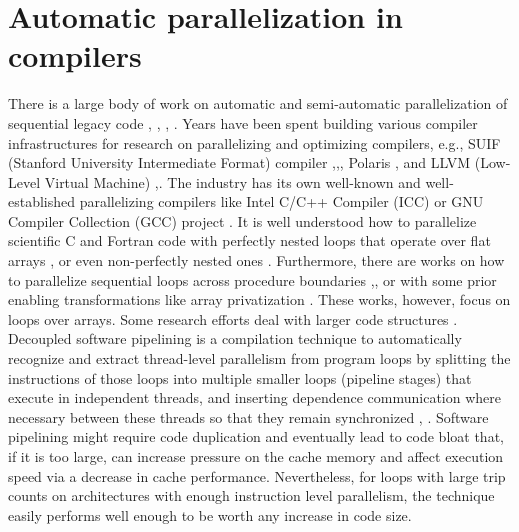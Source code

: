 \section{Automatic parallelization in compilers}
\label{related_work_autopar}
\quad There is a large body of work on automatic and semi-automatic parallelization of sequential legacy code \cite{6813266}, \cite{article12345}, \cite{Bacon:1994:CTH:197405.197406}, \cite{Kennedy:2001:OCM:502981}. Years have been spent building various compiler infrastructures for research on parallelizing \cite{Kennedy:2001:OCM:502981} and optimizing \cite{Muchnick:1998:ACD:286076} compilers, e.g., SUIF (Stanford University Intermediate Format) compiler \cite{546613},\cite{10.5555/891422},\cite{suif_compiler}, Polaris \cite{polaris}, \cite{10.1109/M-PDT.1994.329796} and LLVM (Low-Level Virtual Machine) \cite{llvm-compiler-infrastructure},\cite{Lattner:2004:LCF:977395.977673}. The industry has its own well-known and well-established parallelizing compilers like Intel C/C++ Compiler (ICC) \cite{icc-compiler} or GNU Compiler Collection (GCC) project \cite{gnu-compiler}.\newline\null
\quad It is well understood how to parallelize scientific C and Fortran code with perfectly nested loops that operate over flat arrays \cite{97902}, or even non-perfectly nested ones \cite{10.1145/263699.263719}. Furthermore, there are works on how to parallelize sequential loops across procedure boundaries \cite{10.1145/125826.126055},\cite{10.5555/645671.665383}, or with some prior enabling transformations like array privatization \cite{10.1145/158511.158515}. These works, however, focus on loops over arrays. Some research efforts deal with larger code structures
\cite{1299188}. Decoupled software pipelining is a compilation technique to automatically recognize and extract thread-level parallelism from program loops by splitting the instructions of those loops into multiple smaller loops (pipeline stages) that execute in independent threads, and inserting dependence communication where necessary between these threads so that they remain synchronized \cite{1540952}, \cite{10.1145/1400112.1400113}. Software pipelining might require code duplication and eventually lead to code bloat that, if it is too large, can increase pressure on the cache memory and affect execution speed via a decrease in cache performance. Nevertheless, for loops with large trip counts on architectures with enough instruction level parallelism, the technique easily performs well enough to be worth any increase in code size.\newline\null

